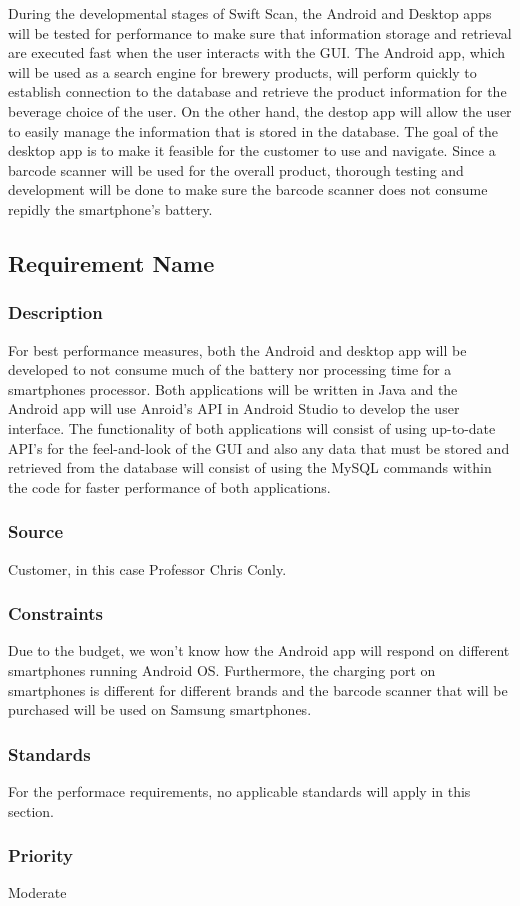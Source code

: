 During the developmental stages of Swift Scan, the Android and Desktop apps will be tested for performance to make sure that information storage and retrieval are executed fast when the user interacts with the GUI.  The Android app, which will be used as a search engine for brewery products, will perform quickly to establish connection to the database and retrieve the product information for the beverage choice of the user.  On the other hand, the destop app will allow the user to easily manage the information that is stored in the database.  The goal of the desktop app is to make it feasible for the customer to use and navigate.  Since a barcode scanner will be used for the overall product, thorough testing and development will be done to make sure the barcode scanner does not consume repidly the smartphone's battery.

\subsection{Requirement Name}
\subsubsection{Description}
For best performance measures, both the Android and desktop app will be developed to not consume much of the battery nor processing time for a smartphones processor.  Both applications will be written in Java and the Android app will use Anroid's API in Android Studio to develop the user interface.  The functionality of both applications will consist of using up-to-date API's for the feel-and-look of the GUI and also any data that must be stored and retrieved from the database will consist of using the MySQL commands within the code for faster performance of both applications. 
\subsubsection{Source}
Customer, in this case Professor Chris Conly.
\subsubsection{Constraints}
Due to the budget, we won't know how the Android app will respond on different smartphones running Android OS.  Furthermore, the charging port on smartphones is different for different brands and the barcode scanner that will be purchased will be used on Samsung smartphones.
\subsubsection{Standards}
For the performace requirements, no applicable standards will apply in this section.
\subsubsection{Priority}
Moderate
